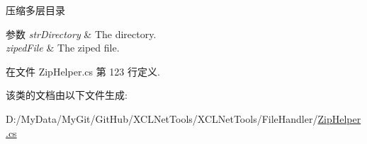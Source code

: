 压缩多层目录 


\begin{DoxyParams}{参数}
{\em str\-Directory} & The directory.\\
\hline
{\em ziped\-File} & The ziped file.\\
\hline
\end{DoxyParams}


在文件 Zip\-Helper.\-cs 第 123 行定义.



该类的文档由以下文件生成\-:\begin{DoxyCompactItemize}
\item 
D\-:/\-My\-Data/\-My\-Git/\-Git\-Hub/\-X\-C\-L\-Net\-Tools/\-X\-C\-L\-Net\-Tools/\-File\-Handler/\hyperlink{_zip_helper_8cs}{Zip\-Helper.\-cs}\end{DoxyCompactItemize}

